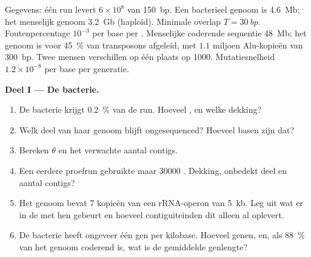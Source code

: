 \begin{problem}
\label{pb:b3:genomics:1}
Gegevens: één run levert $6\times 10^{8}$  van \qty{150}{bp}. Een
bacterieel genoom is \qty{4.6}{Mb}; het menselijk genoom \qty{3.2}{Gb}
(haploïd). Minimale overlap $T = \qty{30}{bp}$. Foutenpercentage
$10^{-3}$ per base per . Menselijke coderende sequentie
\qty{48}{Mb}; het genoom is voor \qty{45}{\%} van transposons afgeleid,
met $1.1$ miljoen Alu-kopieën van \qty{300}{bp}. Twee mensen
verschillen op één plaats op \num{1000}. Mutatiesnelheid
$1.2\times 10^{-8}$ per base per generatie.

\medskip
\noindent\textbf{Deel I --- De bacterie.}
\begin{enumerate}
  \item De bacterie krijgt \qty{0.2}{\%} van de run. Hoeveel , en
        welke dekking?
  \item Welk deel van haar genoom blijft ongesequenced? Hoeveel basen
        zijn dat?
  \item Bereken $\theta$ en het verwachte aantal contigs.
  \item Een eerdere proefrun gebruikte maar \num{30000} . Dekking,
        onbedekt deel en aantal contigs?
  \item Het genoom bevat \num{7} kopieën van een rRNA-operon van
        \qty{5}{kb}. Leg uit wat er in de  met hen gebeurt en
        hoeveel contiguiteinden dit alleen al oplevert.
  \item De bacterie heeft ongeveer één gen per kilobase. Hoeveel genen,
        en, als \qty{88}{\%} van het genoom coderend is, wat is de
        gemiddelde genlengte?
\end{enumerate}


\end{problem}
